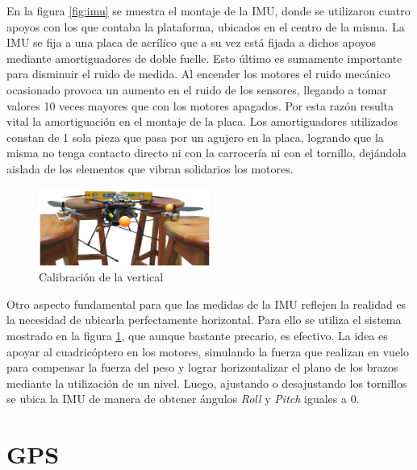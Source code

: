 \documentclass[main]{subfiles}
\begin{document}
En la figura \ref{fig:imu} se muestra el montaje de la IMU, donde se utilizaron cuatro apoyos con los que contaba la plataforma, ubicados en el centro de la misma. La IMU se fija a una placa de acrílico que a su vez está fijada a dichos apoyos mediante amortiguadores de doble fuelle. Esto último es sumamente importante para disminuir el ruido de medida. Al encender los motores el ruido mecánico ocasionado provoca un aumento en el ruido de los sensores, llegando a tomar valores 10 veces mayores que con los motores apagados. Por esta razón resulta vital la amortiguación en el montaje de la placa. Los amortiguadores utilizados constan de 1 sola pieza que pasa por un agujero en la placa, logrando que la misma no tenga contacto directo ni con la carrocería ni con el tornillo, dejándola aislada de los elementos que vibran solidarios los motores.\\

\begin{figure}
	\begin{center}
		\includegraphics[width=0.5\textwidth]{./pics_montaje/horizontalidad.jpg}
	\end{center}
	\caption{Calibraci\'on de la vertical}
	\vspace{-10pt}
	\label{fig:horizontalidad}
\end{figure}

Otro aspecto fundamental para que las medidas de la IMU reflejen la realidad es la necesidad de ubicarla perfectamente horizontal. Para ello se utiliza el sistema mostrado en la figura \ref{fig:horizontalidad}, que aunque bastante precario, es efectivo. La idea es apoyar al cuadricóptero en los motores, simulando la fuerza que realizan en vuelo para compensar la fuerza del peso y lograr horizontalizar el plano de los brazos mediante la utilización de un nivel. Luego, ajustando o desajustando los tornillos se ubica la IMU de manera de obtener ángulos \emph{Roll} y \emph{Pitch} iguales a $0$.

\section{GPS}
\end{document}

